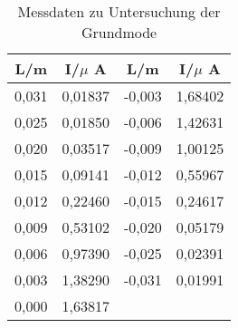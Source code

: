 \begin{table}[h!]
  \centering
  \caption{Messdaten zu Untersuchung der Grundmode}
  \label{tab:grundmode}
  \begin{tabular}{c c c c}
    \toprule
      L/m & I/$\mu$ A & L/m & I/$\mu$ A \\
      \midrule
       0,031  &  0,01837  &  -0,003  &  1,68402 \\
       0,025  &  0,01850  &  -0,006  &  1,42631 \\
       0,020  &  0,03517  &  -0,009  &  1,00125 \\
       0,015  &  0,09141  &  -0,012  &  0,55967 \\
       0,012  &  0,22460  &  -0,015  &  0,24617 \\
       0,009  &  0,53102  &  -0,020  &  0,05179 \\
       0,006  &  0,97390  &  -0,025  &  0,02391 \\
       0,003  &  1,38290  &  -0,031  &  0,01991 \\
       0,000  &  1,63817  &    & \\
    \bottomrule
  \end{tabular}
\end{table}

%
